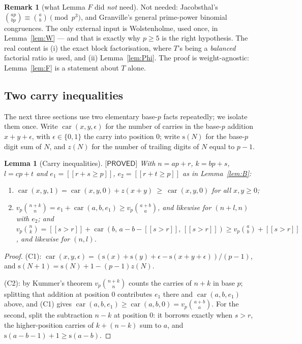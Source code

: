 \documentclass[11pt,reqno]{amsart}
\theoremstyle{plain}
\newtheorem{lemma}[theorem]{Lemma}
\theoremstyle{definition}
\newtheorem{remark}[theorem]{Remark}
\theoremstyle{remark}
\numberwithin{equation}{section}
\newcommand{\car}{\operatorname{car}}
\newcommand{\ii}[1]{[\![#1]\!]}
\newcommand{\PROVED}{\textsf{[PROVED]}}
\begin{document}
\begin{remark}[what Lemma $F$ did \emph{not} need]
Not needed: Jacobsthal's $\binom{ap}{bp}\equiv\binom ab\pmod{p^3}$, and Granville's general
prime-power binomial congruences. The only external input is Wolstenholme, used once, in
Lemma~\ref{lem:W} --- and that is exactly why $p\ge5$ is the right hypothesis. The real content
is (i) the exact block factorisation, where $T$'s being a \emph{balanced} factorial ratio is
used, and (ii) Lemma~\ref{lem:Phi}. The proof is weight-agnostic: Lemma~\ref{lem:F} is a
statement about $T$ alone.
\end{remark}

\subsection{Two carry inequalities}

The next three sections use two elementary base-$p$ facts repeatedly; we isolate them once.
Write $\car(x,y,\epsilon)$ for the number of carries in the base-$p$ addition $x+y+\epsilon$,
with $\epsilon\in\{0,1\}$ the carry into position $0$; write $\mathrm s(N)$ for the base-$p$
digit sum of $N$, and $z(N)$ for the number of trailing digits of $N$ equal to $p-1$.

\begin{lemma}[Carry inequalities]\label{lem:carry}
$\PROVED$ With $n=ap+r$, $k=bp+s$, $l=cp+t$ and $e_1=\ii{r+s\ge p}$, $e_2=\ii{r+t\ge p}$ as in
Lemma~\textup{\ref{lem:B}}:
\begin{enumerate}[leftmargin=2.4em,label=\textup{(C\arabic*)}]
\item $\car(x,y,1)=\car(x,y,0)+z(x+y)\ \ge\ \car(x,y,0)$ for all $x,y\ge0$;
\item $v_p\binom{n+k}{n}=e_1+\car(a,b,e_1)\ge v_p\binom{a+b}{a}$, and likewise for
  $(n+l,n)$ with $e_2$; and
  $v_p\binom nk=\ii{s>r}+\car(b,\,a-b-\ii{s>r},\,\ii{s>r})\ge v_p\binom ab+\ii{s>r}$,
  and likewise for $(n,l)$.
\end{enumerate}
\end{lemma}

\begin{proof}
(C1): $\car(x,y,\epsilon)=(\mathrm s(x)+\mathrm s(y)+\epsilon-\mathrm s(x+y+\epsilon))/(p-1)$,
and $\mathrm s(N+1)=\mathrm s(N)+1-(p-1)z(N)$.

(C2): by Kummer's theorem $v_p\binom{n+k}{n}$ counts the carries of $n+k$ in base $p$; splitting
that addition at position $0$ contributes $e_1$ there and $\car(a,b,e_1)$ above, and (C1) gives
$\car(a,b,e_1)\ge\car(a,b,0)=v_p\binom{a+b}{a}$. For the second, split the subtraction
$n-k$ at position $0$: it borrows exactly when $s>r$, the higher-position carries of
$k+(n-k)$ sum to $a$, and $\mathrm s(a-b-1)+1\ge\mathrm s(a-b)$.
\end{proof}
\end{document}
